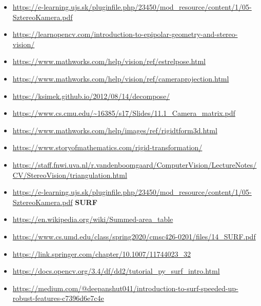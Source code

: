 \documentclass[12pt]{report}
\begin{document}
\begin{itemize}
            \item \url{https://e-learning.ujs.sk/pluginfile.php/23450/mod_resource/content/1/05-SztereoKamera.pdf}
            \item \url{https://learnopencv.com/introduction-to-epipolar-geometry-and-stereo-vision/}
            \item \url{https://www.mathworks.com/help/vision/ref/estrelpose.html}
            \item \url{https://www.mathworks.com/help/vision/ref/cameraprojection.html}
            \item \url{https://ksimek.github.io/2012/08/14/decompose/}
            \item \url{https://www.cs.cmu.edu/~16385/s17/Slides/11.1_Camera_matrix.pdf}
            \item \url{https://www.mathworks.com/help/images/ref/rigidtform3d.html}
            \item \url{https://www.storyofmathematics.com/rigid-transformation/}
            \item \url{https://staff.fnwi.uva.nl/r.vandenboomgaard/ComputerVision/LectureNotes/CV/StereoVision/triangulation.html}
            \item \url{https://e-learning.ujs.sk/pluginfile.php/23450/mod_resource/content/1/05-SztereoKamera.pdf}
        \textbf{SURF}
            \item \url{https://en.wikipedia.org/wiki/Summed-area_table}
            \item \url{https://www.cs.umd.edu/class/spring2020/cmsc426-0201/files/14_SURF.pdf}
            \item \url{https://link.springer.com/chapter/10.1007/11744023_32}
            \item \url{https://docs.opencv.org/3.4/df/dd2/tutorial_py_surf_intro.html}
            \item \url{https://medium.com/@deepanshut041/introduction-to-surf-speeded-up-robust-features-c7396d6e7c4e}
        \end{itemize}
\end{document}
